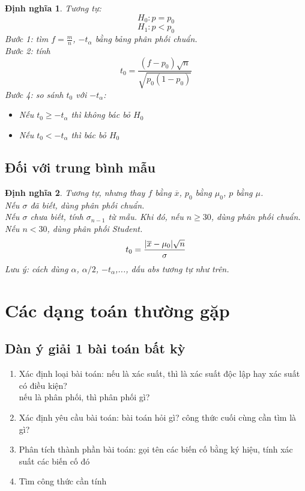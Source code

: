 \documentclass[12pt]{article}
\def\bar#1{\overline{#1}}
\newtheorem{thm}{Định nghĩa}
\begin{document}
\begin{thm}
    Tương tự:
    \begin{equation}
        H_0: p = p_0
    \end{equation}
    \begin{equation}
        H_1: p < p_0
    \end{equation}
    Bước 1: tìm $f = \frac{m}{n}$,  $-t_{\alpha}$ bằng bảng phân phối chuẩn. \\
    Bước 2: tính \begin{equation}
        t_0 = \frac{(f - p_0)\sqrt{n}}{\sqrt{p_0(1 - p_0)}}
    \end{equation}
    Bước 4: so sánh $t_0$ với $-t_{\alpha}$:
    \begin{itemize}
        \item Nếu $t_0 \geq -t_{\alpha}$ thì không bác bỏ $H_0$
        \item Nếu $ t_0 < -t_{\alpha}$ thì bác bỏ $H_0$
    \end{itemize}
\end{thm}

\subsection{Đối với trung bình mẫu}
\begin{thm}
    Tương tự, nhưng thay $f$ bằng $\bar{x}$, $p_0$ bằng $\mu_0$, $p$ bằng $\mu$. \\
    Nếu $\sigma$ đã biết, dùng phân phối chuẩn. \\
    Nếu $\sigma$ chưa biết, tính $\sigma_{n-1}$ từ mẫu. Khi đó, nếu $n \geq 30$, dùng phân phối chuẩn. Nếu $n < 30$, dùng phân phối Student. \\
    \begin{equation}
        t_0 = \frac{\abs{\bar{x} - \mu_0}\sqrt{n}}{\sigma}
    \end{equation}
    Lưu ý: cách dùng $\alpha$, $\alpha/2$, $-t_{\alpha}$,..., dấu abs tương tự như trên.
\end{thm}


\section {Các dạng toán thường gặp}
\subsection{Dàn ý giải 1 bài toán bất kỳ}
\begin{enumerate}
    \item Xác định loại bài toán: nếu là xác suất, thì là xác suất độc lập hay xác suất có điều kiện? \\
    nếu là phân phối, thì phân phối gì?
    \item Xác định yêu cầu bài toán: bài toán hỏi gì? công thức cuối cùng cần tìm là gì?
    \item Phân tích thành phần bài toán:
    gọi tên các biến cố bằng ký hiệu, tính xác suất các biến cố đó
    \item Tìm công thức cần tính
\end{enumerate}
\end{document}
